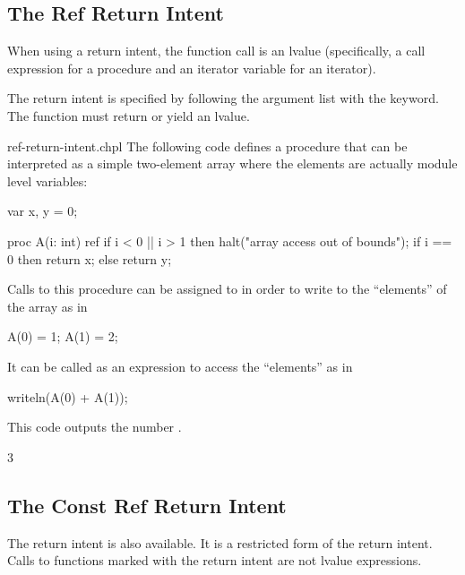 \subsection{The Ref Return Intent}
\label{Ref_Return_Intent}

When using a  return intent, the function call is an lvalue
(specifically, a call expression for a procedure and an iterator variable for
an iterator).

The  return intent is specified by following the argument list with
the  keyword.  The function must return or yield an lvalue.

\begin{chapelexample}{ref-return-intent.chpl}
The following code defines a procedure that can be interpreted as a
simple two-element array where the elements are actually module
level variables:
\begin{chapel}
var x, y = 0;

proc A(i: int) ref {
  if i < 0 || i > 1 then
    halt("array access out of bounds");
  if i == 0 then
    return x;
  else
    return y;
}
\end{chapel}
Calls to this procedure can be assigned to in order to write to the ``elements''
of the array as in
\begin{chapel}
A(0) = 1;
A(1) = 2;
\end{chapel}
It can be called as an expression to access the ``elements'' as in
\begin{chapel}
writeln(A(0) + A(1));
\end{chapel}
This code outputs the number .

\begin{chapeloutput}
3
\end{chapeloutput}
\end{chapelexample}


\subsection{The Const Ref Return Intent}
\label{Const_Ref_Return_Intent}

The  return intent is also available. It is a restricted
form of the  return intent. Calls to functions marked with
the  return intent are not lvalue expressions.

